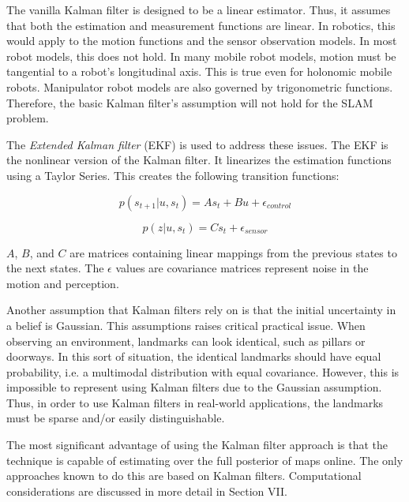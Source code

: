 \documentclass[10pt,conference]{ieeeconf}
\begin{document}
    The vanilla Kalman filter is designed to be a linear estimator. Thus, it assumes that both the estimation and measurement functions are linear. In robotics, this would apply to the motion functions and the sensor observation models. In most robot models, this does not hold. In many mobile robot models, motion must be tangential to a robot's longitudinal axis. This is true even for holonomic mobile robots. Manipulator robot models are also governed by trigonometric functions. Therefore, the basic Kalman filter's assumption will not hold for the SLAM problem.
    
    
    The \emph{Extended Kalman filter} (EKF) is used to address these issues. The EKF is the nonlinear version of the Kalman filter. It linearizes the estimation functions using a Taylor Series. This creates the following transition functions:
    
    \begin{equation}
    p(s_{t+1}|u,s_t) = As_t+Bu+\epsilon_{control}
    \label{nlm}
    \end{equation}
    
    \begin{equation}
    p(z|u,s_t) = Cs_t+\epsilon_{sensor}
    \label{nls}
    \end{equation}
    
	$A$, $B$, and $C$ are matrices containing linear mappings from the previous states to the next states. The $\epsilon$ values are covariance matrices represent noise in the motion and perception.
	
	Another assumption that Kalman filters rely on is that the initial uncertainty in a belief is Gaussian. This assumptions raises critical practical issue. When observing an environment, landmarks can look identical, such as pillars or doorways. In this sort of situation, the identical landmarks should have equal probability, i.e. a multimodal distribution with equal covariance. However, this is impossible to represent using Kalman filters due to the Gaussian assumption. Thus, in order to use Kalman filters in real-world applications, the landmarks must be sparse and/or easily distinguishable.  

    	The most significant advantage of using the Kalman filter approach is that the technique is capable of estimating over the full posterior of maps online. The only approaches known to do this are based on Kalman filters. Computational considerations are discussed in more detail in Section VII.
\end{document}
